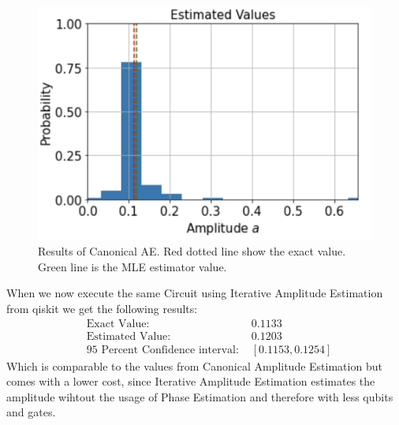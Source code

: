  \begin{figure}[H]
  \begin{center}
    \includegraphics[width=\linewidth]{images/resultAE.png}
  \end{center}
  \caption{Results of Canonical AE. Red dotted line show the exact value. Green line is the MLE estimator value. }
  \label{fig:resultAE}
\end{figure}
When we now execute the same Circuit using Iterative Amplitude Estimation \cite{Grinko_2021} from qiskit we get the following results:
\begin{align}
    &\text{Exact Value: } &0.1133\\
    &\text{Estimated Value: } &0.1203\\
    &\text{95 Percent Confidence interval:	} &[0.1153, 0.1254]
\end{align}
Which is comparable to the values from Canonical Amplitude Estimation but comes with a lower cost, since Iterative Amplitude Estimation estimates the amplitude wihtout the usage of Phase Estimation and therefore with less qubits and gates.
